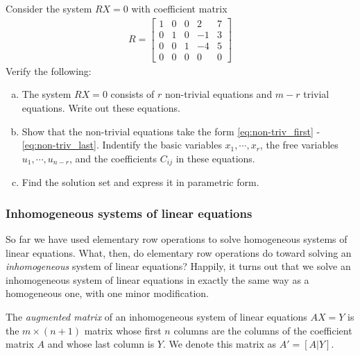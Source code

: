 \documentclass[12pt,letterpaper,reqno]{article}
\numberwithin{equation}{section}
\newcommand{\ti}[1]{\textit{#1}}
\begin{document}
\begin{exercise}\label{ex:hom_system_examp}
Consider the system $RX=0$ with coefficient matrix
\begin{align*}
	R=\begin{bmatrix}
		1&0&0&2&7 \\
		0&1&0&-1&3 \\
		0&0&1&-4&5 \\
		0&0&0&0&0 
	\end{bmatrix}
\end{align*}
Verify the following:
\begin{enumerate}[(a)]
	\item The system $RX=0$ consists of $r$ non-trivial equations and $m-r$ trivial equations. Write out these equations.
	\item Show that the non-trivial equations take the form \eqref{eq:non-triv_first} - \eqref{eq:non-triv_last}. Indentify the basic variables $x_1,\cdots,x_r$, the free variables $u_1,\cdots,u_{n-r}$, and the coefficients $C_{ij}$ in these equations.
	\item Find the solution set and express it in parametric form.
\end{enumerate}	
\end{exercise}

\subsubsection{Inhomogeneous systems of linear equations}
So far we have used elementary row operations to solve homogeneous systems of linear equations. What, then, do elementary row operations do toward solving an \emph{inhomogeneous} system of linear equations? Happily, it turns out that we solve an inhomogeneous system of linear equations in exactly the same way as a homogeneous one, with one minor modification.

\begin{defn}\label{def:augmented_matrix}
The \ti{augmented matrix} of an inhomogeneous system of linear equations $AX=Y$ is the $m \times (n+1)$ matrix whose first $n$ columns are the columns of the coefficient matrix $A$ and whose last column is $Y$. We denote this matrix as $A'=[A|Y]$.
\end{defn}
\end{document}

